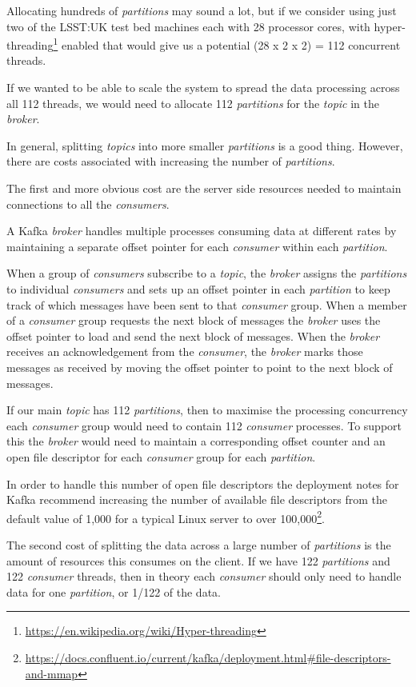 \documentclass{article}
\newcommand{\kafka} {Kafka\xspace}
\newcommand{\kftopic} {\textit{topic}\xspace}
\newcommand{\kftopics} {\textit{topics}\xspace}
\newcommand{\kfbroker} {\textit{broker}\xspace}
\newcommand{\kfconsumer} {\textit{consumer}\xspace}
\newcommand{\kfconsumers} {\textit{consumers}\xspace}
\newcommand{\kfpartition} {\textit{partition}\xspace}
\newcommand{\kfpartitions} {\textit{partitions}\xspace}
\newcommand{\footurl}[1] {\footnote{\url{#1}}}
\begin{document}
Allocating hundreds of \kfpartitions may sound a lot, but if we consider using just two of the LSST:UK test bed machines each with 28 processor cores, with hyper-threading\footurl{https://en.wikipedia.org/wiki/Hyper-threading} enabled that would give us a potential (28 x 2 x 2) = 112 concurrent threads.

If we wanted to be able to scale the system to spread the data processing across all 112 threads, we would need to allocate 112 \kfpartitions for the \kftopic in the \kfbroker.

In general, splitting \kftopics into more smaller \kfpartitions is a good thing.
However, there are costs associated with increasing the number of \kfpartitions.

The first and more obvious cost are the server side resources needed to maintain connections to all the \kfconsumers.

A Kafka \kfbroker handles multiple processes consuming data at different rates by maintaining a separate offset pointer for each \kfconsumer within each \kfpartition.

When a group of \kfconsumers subscribe to a \kftopic, the \kfbroker assigns the \kfpartitions to individual \kfconsumers and sets up an offset pointer in each \kfpartition to keep track of which messages have been sent to that \kfconsumer group.
When a member of a \kfconsumer group requests the next block of messages the \kfbroker uses the offset pointer to load and send the next block of messages.
When the \kfbroker receives an acknowledgement from the \kfconsumer, the \kfbroker marks those messages as received by moving the offset pointer to point to the next block of messages.

If our main \kftopic has 112 \kfpartitions, then to maximise the processing concurrency each \kfconsumer group would need to contain 112 \kfconsumer processes.
To support this the \kfbroker would need to maintain a corresponding offset counter and an open file descriptor for each \kfconsumer group for each \kfpartition.

In order to handle this number of open file descriptors the deployment notes for \kafka recommend increasing the number of available file descriptors from the default value of 1,000 for a typical Linux server to over 100,000\footurl{https://docs.confluent.io/current/kafka/deployment.html#file-descriptors-and-mmap}.

The second cost of splitting the data across a large number of \kfpartitions is the amount of resources this consumes on the client.
If we have 122 \kfpartitions and 122 \kfconsumer threads, then in theory each \kfconsumer should only need to handle data for one \kfpartition, or 1/122 of the data.
\end{document}
